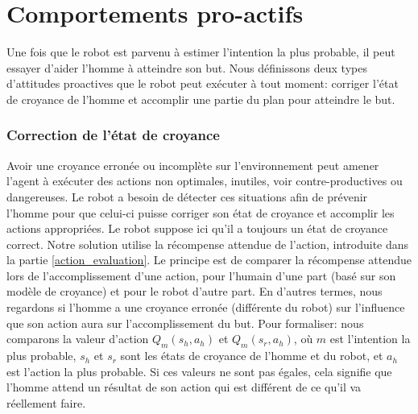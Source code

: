 \documentclass[a4paper,11pt,twoside]{StyleThese}
\begin{document}
\section{Comportements pro-actifs}
\label{sec:robot_reaction}

Une fois que le robot est parvenu à estimer l'intention la plus probable, il peut essayer d'aider l'homme à atteindre son but. Nous définissons deux types d'attitudes proactives que le robot peut exécuter à tout moment: corriger l'état de croyance de l'homme et accomplir une partie du plan pour atteindre le but.

\subsubsection{Correction de l'état de croyance}
\label{sec:correctingBf}
Avoir une croyance erronée ou incomplète sur l'environnement peut amener l'agent à exécuter des actions non optimales, inutiles, voir contre-productives ou dangereuses. Le robot a besoin de détecter ces situations afin de prévenir l'homme pour que celui-ci puisse corriger son état de croyance et accomplir les actions appropriées. Le robot suppose ici qu'il a toujours un état de croyance correct. Notre solution utilise la récompense attendue de l'action, introduite dans la partie \ref{action_evaluation}. Le principe est de comparer la récompense attendue lors de l'accomplissement d'une action, pour l'humain d'une part (basé sur son modèle de croyance) et pour le robot d'autre part. En d'autres termes, nous regardons si l'homme a une croyance erronée (différente du robot) sur l'influence que son action aura sur l'accomplissement du but. Pour formaliser: nous comparons la valeur d'action \(Q_m(s_h,a_h)\) et \(Q_m(s_r,a_h)\), où $m$ est l'intention la plus probable, $s_h$ et $s_r$ sont les états de croyance de l'homme et du robot, et $a_h$ est l'action la plus probable. Si ces valeurs ne sont pas égales, cela signifie que l'homme attend un résultat de son action qui est différent de ce qu'il va réellement faire.
\end{document}
